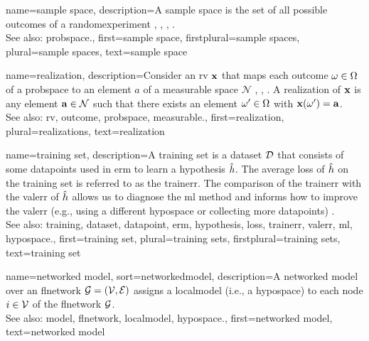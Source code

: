 {name={sample space}, 
  	description={A \gls{sample} space is the set of all possible 
		\glspl{outcome} of a \gls{randomexperiment} \cite{BillingsleyProbMeasure}, 
		\cite{BertsekasProb}, \cite{AshProbMeasure}, \cite{papoulis}. 
		\\
 		See also: \gls{probspace}.},  
  	first={sample space}, 
 	firstplural={sample spaces},
 	plural={sample spaces},
  	text={sample space}
} 
	
{name={realization},
	description={Consider an \gls{rv} ${\bf x}$ that maps each \gls{outcome} 
		$\omega \in \Omega$ of a \gls{probspace} to an element $a$ of a \gls{measurable} space $\mathcal{N}$ 
		\cite{RudinBookPrinciplesMatheAnalysis}, \cite{BillingsleyProbMeasure}, \cite{HalmosMeasure}. 
		A realization of ${\bf x}$ is any element ${\bf a} \in \mathcal{N}$ such that there exists 
		an element $\omega' \in \Omega$ with ${\bf x}(\omega') = {\bf a}$.
			\\
		See also: \gls{rv}, \gls{outcome}, \gls{probspace}, \gls{measurable}.}, 
	first={realization},
	plural={realizations},
	text={realization}  
}

{name={training set},
	description={A \gls{training} set is a \gls{dataset} $\mathcal{D}$ that consists of some \glspl{datapoint} used in \gls{erm} 
		to learn a \gls{hypothesis} $\hat{h}$. The average \gls{loss} of $\hat{h}$ on the 
		\gls{training} set is referred to as the \gls{trainerr}. The comparison of the \gls{trainerr} with the 
		\gls{valerr} of $\hat{h}$ allows us to diagnose the \gls{ml} method and informs how to improve 
		the \gls{valerr} (e.g., using a different \gls{hypospace} or collecting more \glspl{datapoint}) \cite[Sec. 6.6]{MLBasics}.
			\\
		See also: \gls{training}, \gls{dataset}, \gls{datapoint}, \gls{erm}, \gls{hypothesis}, \gls{loss}, \gls{trainerr}, \gls{valerr}, \gls{ml}, \gls{hypospace}.},
	first={training set},
	plural={training sets},
	firstplural={training sets},
	text={training set}  
}

{name={networked model},
sort={networkedmodel},
 	description={A networked \gls{model} over an \gls{flnetwork} $\mathcal{G} = \left( \mathcal{V},\mathcal{E} \right)$ assigns 
   		a \gls{localmodel} (i.e., a \gls{hypospace}) to each node $i \in \mathcal{V}$ of the \gls{flnetwork} $\mathcal{G}$.
   		\\
		See also: \gls{model}, \gls{flnetwork}, \gls{localmodel}, \gls{hypospace}.}, 
   first={networked model},
   text={networked model}  
}

